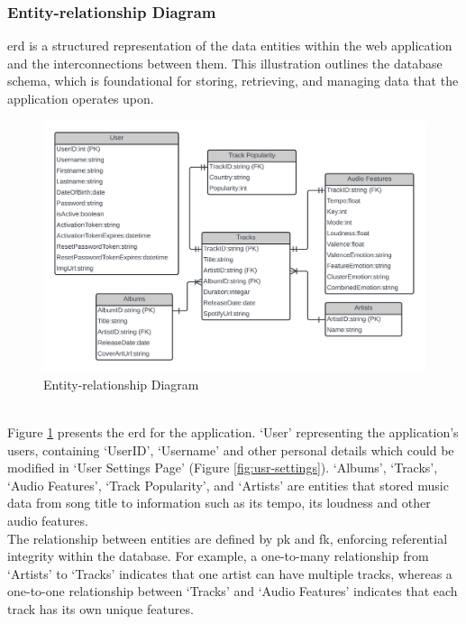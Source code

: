 \subsubsection{Entity-relationship Diagram}
\gls{erd} is a structured representation of the data entities within the web application and the interconnections between them. 
This illustration outlines the database schema, which is foundational for storing, retrieving, and managing data that the application operates upon.
\begin{figure}[!ht]
    \centering
    \includegraphics[width=14cm]{Images/erd.png}
    \caption{Entity-relationship Diagram}
    \label{fig:erd}
\end{figure}
\\
\indent Figure \ref{fig:erd} presents the \gls{erd} for the application.
`User' representing the application's users, containing `UserID', `Username' and other personal details which could be modified in `User Settings Page' (Figure \ref{fig:usr-settings}).
`Albums', `Tracks', `Audio Features', `Track Popularity', and `Artists' are entities that stored music data from song title to information such as its tempo, its loudness and other audio features.
\\
\indent The relationship between entities are defined by \gls{pk} and \gls{fk}, enforcing referential integrity within the database.
For example, a one-to-many relationship from `Artists' to `Tracks' indicates that one artist can have multiple tracks, whereas a one-to-one relationship between `Tracks' and `Audio Features' indicates that each track has its own unique features.
\\
